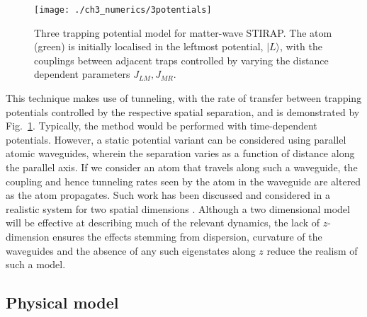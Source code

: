 \begin{figure}
    \centering
    \texttt{[image: ./ch3\_numerics/3potentials]}
    \caption{Three trapping potential model for matter-wave STIRAP. The atom (green) is initially localised in the leftmost potential, $|L\rangle$, with the couplings between adjacent traps controlled by varying the distance dependent parameters $J_{LM},J_{MR}$.}
    \label{fig:ch3_stirap}
\end{figure}

This technique makes use of tunneling, with the rate of transfer between trapping potentials controlled by the respective spatial separation, and is demonstrated by Fig.~\ref{fig:ch3_stirap}. Typically, the method would be performed with time-dependent potentials. However, a static potential variant can be considered using parallel atomic waveguides, wherein the separation varies as a function of distance along the parallel axis. If we consider an atom that travels along such a waveguide, the coupling and hence tunneling rates seen by the atom in the waveguide are altered as the atom propagates. Such work has been discussed and considered in a realistic system for two spatial dimensions \cite{OSullivan:10}. Although a two dimensional model will be effective at describing much of the relevant dynamics, the lack of $z$-dimension ensures the effects stemming from dispersion, curvature of the waveguides and the absence of any such eigenstates along $z$ reduce the realism of such a model.

\subsection{Physical model}

